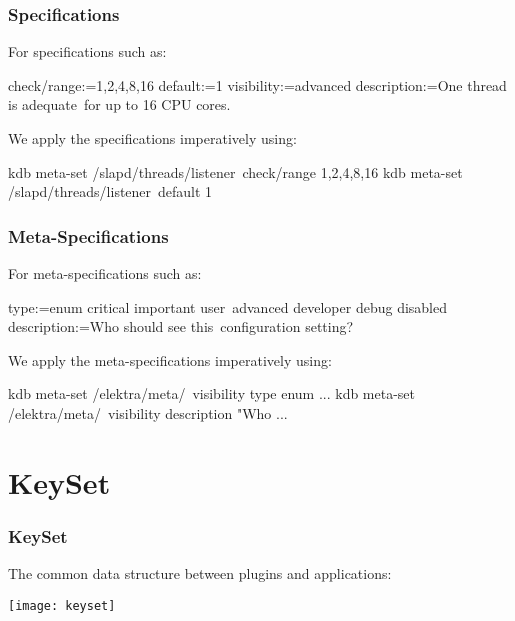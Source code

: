 \begin{frame}[fragile]
	\frametitle{Specifications}
	For specifications such as:

	\begin{code}
	  check/range:=1,2,4,8,16
	  default:=1
	  visibility:=advanced
	  description:=One thread is adequate\
		       for up to 16 CPU cores.
	\end{code}

	\vspace{0.6cm}

	We apply the specifications imperatively using:

	\begin{code}[language=bash,morekeywords={meta-set}]
	kdb meta-set /slapd/threads/listener\
		check/range 1,2,4,8,16
	kdb meta-set /slapd/threads/listener\
		default 1
	\end{code}
\end{frame}

\begin{frame}[fragile]
	\frametitle{Meta-Specifications}
	For meta-specifications such as:

	\small
	\begin{code}
	[visibility]
	type:=enum critical important user\
	      advanced developer debug disabled
	description:=Who should see this\
	     configuration setting?
	\end{code}

	\vspace{1cm}

	We apply the meta-specifications imperatively using:

	\begin{code}[language=bash,morekeywords={meta-set}]
	kdb meta-set /elektra/meta/\
		visibility type enum ...
	kdb meta-set /elektra/meta/\
		visibility description "Who ...
	\end{code}
\end{frame}

\section{KeySet}

\begin{frame}
	\frametitle{KeySet}

	The common data structure between plugins and applications:
	\vspace{1cm}

	\texttt{[image: keyset]}
\end{frame}

